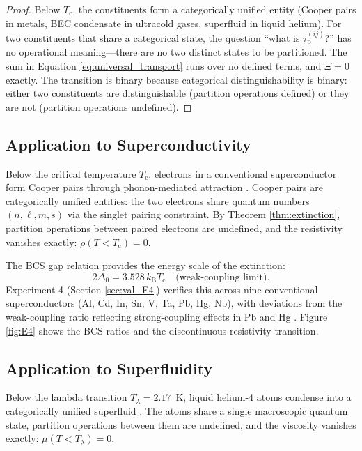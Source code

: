 \documentclass[twocolumn,10pt,a4paper]{article}
\theoremstyle{definition}
\theoremstyle{remark}
\newcommand{\kB}{k_{\mathrm{B}}}
\newcommand{\Tcrit}{T_{\mathrm{c}}}
\newcommand{\tauP}{\tau_{\mathrm{p}}}
\newcommand{\Transp}{\Xi}
\begin{document}
\begin{proof}
Below $\Tcrit$, the constituents form a categorically unified entity (Cooper pairs in metals, BEC condensate in ultracold gases, superfluid in liquid helium). For two constituents that share a categorical state, the question ``what is $\tauP^{(ij)}$?'' has no operational meaning---there are no two distinct states to be partitioned. The sum in Equation \eqref{eq:universal_transport} runs over no defined terms, and $\Transp = 0$ exactly. The transition is binary because categorical distinguishability is binary: either two constituents are distinguishable (partition operations defined) or they are not (partition operations undefined).
\end{proof}

\subsection{Application to Superconductivity}

Below the critical temperature $\Tcrit$, electrons in a conventional superconductor form Cooper pairs through phonon-mediated attraction \citep{bcs1957,onnes1911}. Cooper pairs are categorically unified entities: the two electrons share quantum numbers $(n, \ell, m, s)$ via the singlet pairing constraint. By Theorem \ref{thm:extinction}, partition operations between paired electrons are undefined, and the resistivity vanishes exactly: $\rho(T < \Tcrit) = 0$.

The BCS gap relation provides the energy scale of the extinction:
\begin{equation}
2\Delta_0 = 3.528\, \kB \Tcrit \quad \text{(weak-coupling limit)}.
\label{eq:bcs_gap}
\end{equation}
Experiment 4 (Section \ref{sec:val_E4}) verifies this across nine conventional superconductors (Al, Cd, In, Sn, V, Ta, Pb, Hg, Nb), with deviations from the weak-coupling ratio reflecting strong-coupling effects in Pb and Hg \citep{schrieffer1964,tinkham1996}. Figure \ref{fig:E4} shows the BCS ratios and the discontinuous resistivity transition.

\subsection{Application to Superfluidity}

Below the lambda transition $T_\lambda = 2.17$~K, liquid helium-4 atoms condense into a categorically unified superfluid \citep{kapitza1938,allen1938,landau1941}. The atoms share a single macroscopic quantum state, partition operations between them are undefined, and the viscosity vanishes exactly: $\mu(T < T_\lambda) = 0$.
\end{document}
